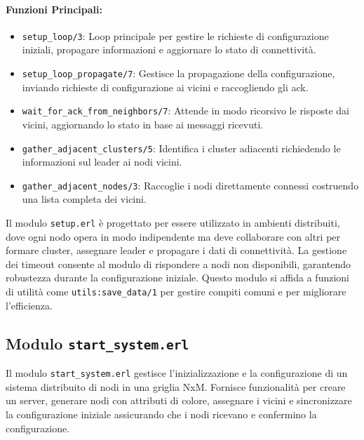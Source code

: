 \documentclass[12pt, a4paper]{report}
\begin{document}
\paragraph{Funzioni Principali:}
\begin{itemize}
    \item \texttt{setup\_loop/3}: Loop principale per gestire le richieste di configurazione iniziali, propagare informazioni e aggiornare lo stato di connettività.
    \item \texttt{setup\_loop\_propagate/7}: Gestisce la propagazione della configurazione, inviando richieste di configurazione ai vicini e raccogliendo gli ack.
    \item \texttt{wait\_for\_ack\_from\_neighbors/7}: Attende in modo ricorsivo le risposte dai vicini, aggiornando lo stato in base ai messaggi ricevuti.
    \item \texttt{gather\_adjacent\_clusters/5}: Identifica i cluster adiacenti richiedendo le informazioni sul leader ai nodi vicini.
    \item \texttt{gather\_adjacent\_nodes/3}: Raccoglie i nodi direttamente connessi costruendo una lista completa dei vicini.
\end{itemize}

\noindent
Il modulo \texttt{setup.erl} è progettato per essere utilizzato in ambienti distribuiti, dove ogni nodo opera in modo indipendente ma deve collaborare con altri per formare cluster, assegnare leader e propagare i dati di connettività. La gestione dei timeout consente al modulo di rispondere a nodi non disponibili, garantendo robustezza durante la configurazione iniziale. Questo modulo si affida a funzioni di utilità come \texttt{utils:save\_data/1} per gestire compiti comuni e per migliorare l'efficienza.

\subsection{Modulo \texttt{start\_system.erl}}

Il modulo \texttt{start\_system.erl} gestisce l'inizializzazione e la configurazione di un sistema distribuito di nodi in una griglia NxM. Fornisce funzionalità per creare un server, generare nodi con attributi di colore, assegnare i vicini e sincronizzare la configurazione iniziale assicurando che i nodi ricevano e confermino la configurazione.
\end{document}
